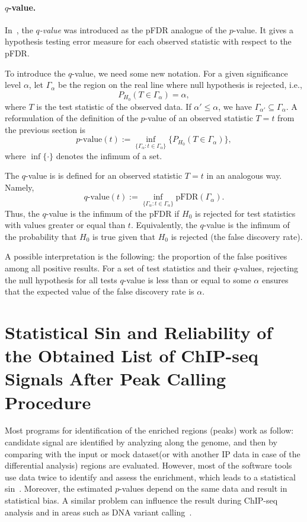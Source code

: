 \paragraph{$q$-value.}
In~\cite{storey2003positive}, the \emph{$q$-value} was introduced as the pFDR analogue of the $p$-value.
It gives a hypothesis testing error measure for each observed statistic with respect to the pFDR.

To introduce the $q$-value, we need some new notation.
For a given significance level $\alpha$, let $\Gamma_\alpha$ be the region on the real line where null hypothesis is rejected, i.e.,
$$P_{H_0}(T \in \Gamma_\alpha) = \alpha,$$
where $T$ is the test statistic of the observed data.
If $\alpha' \leq \alpha$, we have $\Gamma_{\alpha'} \subseteq \Gamma_\alpha$.
A reformulation of the definition of the $p$-value of an observed statistic $T = t$ from the previous section is
$$\text{$p$-value}(t) := \inf_{\{\Gamma_\alpha : t \in \Gamma_\alpha\}}\{P_{H_0}(T \in \Gamma_\alpha)\},$$
where $\inf\{\cdot\}$ denotes the infimum of a set.

The $q$-value is is defined for an observed statistic $T = t$ in an analogous way.
Namely,
$$\text{$q$-value}(t) := \inf_{\{\Gamma_\alpha : t \in \Gamma_\alpha\}}\text{pFDR}(\Gamma_\alpha).$$
Thus, the $q$-value is the infimum of the $\text{pFDR}$ if $H_0$ is rejected for test statistics with values greater or equal than $t$.
Equivalently, the $q$-value is the infimum of the probability that $H_0$ is true given that $H_0$ is rejected (the false discovery rate).

A possible interpretation is the following: the proportion of the false positives among all positive results.
For a set of test statistics and their $q$-values, rejecting the null hypothesis for all tests $q$-value is less than or equal to some $\alpha$ ensures that the expected value of the false discovery rate is $\alpha$.







\section{Statistical Sin and Reliability of the Obtained List of ChIP-seq Signals After Peak Calling Procedure}

Most programs for identification of the enriched regions (peaks) work as follow: candidate signal are identified by analyzing along the genome, and then by comparing with the input or mock dataset(or with another IP data in case of the differential analysis) regions are evaluated. 
However, most of the software tools use data twice to identify and assess the enrichment, which leads to a statistical sin~\cite{lun2014novo}. 
Moreover, the estimated $p$-values depend on the same data and result in statistical bias.
A similar problem can influence the result during ChIP-seq analysis and in areas such as DNA variant calling~\cite{chitpin2019recap}.

